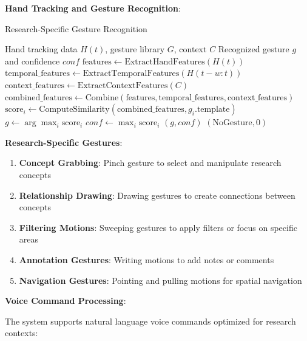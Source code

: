 \documentclass[10pt,twocolumn]{article}
\begin{document}
\textbf{Hand Tracking and Gesture Recognition}:

\begin{algorithm}[H]
\caption{Research-Specific Gesture Recognition}
\label{alg:gesture_recognition}
\begin{algorithmic}[1]
\REQUIRE Hand tracking data $H(t)$, gesture library $G$, context $C$
\ENSURE Recognized gesture $g$ and confidence $conf$
\STATE $\text{features} \leftarrow \text{ExtractHandFeatures}(H(t))$
\STATE $\text{temporal\_features} \leftarrow \text{ExtractTemporalFeatures}(H(t-w:t))$
\STATE $\text{context\_features} \leftarrow \text{ExtractContextFeatures}(C)$
\STATE $\text{combined\_features} \leftarrow \text{Combine}(\text{features}, \text{temporal\_features}, \text{context\_features})$
    \STATE $\text{score}_i \leftarrow \text{ComputeSimilarity}(\text{combined\_features}, g_i.\text{template})$
\ENDFOR
\STATE $g \leftarrow \arg\max_i \text{score}_i$
\STATE $conf \leftarrow \max_i \text{score}_i$
    \RETURN $(g, conf)$
\ELSE
    \RETURN $(\text{NoGesture}, 0)$
\ENDIF
\end{algorithmic}
\end{algorithm}

\textbf{Research-Specific Gestures}:
\begin{enumerate}
    \item \textbf{Concept Grabbing}: Pinch gesture to select and manipulate research concepts
    \item \textbf{Relationship Drawing}: Drawing gestures to create connections between concepts
    \item \textbf{Filtering Motions}: Sweeping gestures to apply filters or focus on specific areas
    \item \textbf{Annotation Gestures}: Writing motions to add notes or comments
    \item \textbf{Navigation Gestures}: Pointing and pulling motions for spatial navigation
\end{enumerate}

\textbf{Voice Command Processing}:

The system supports natural language voice commands optimized for research contexts:
\end{document}
